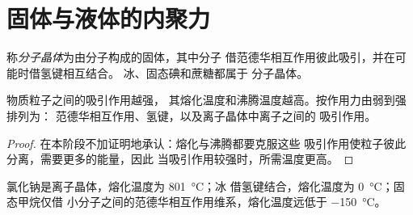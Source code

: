 \section{固体与液体的内聚力}

\begin{definition}[分子晶体]\label{def:g11:polarity-and-cohesion:molecular-solid}
称\emph{分子晶体}为由分子构成的固体，其中分子
借范德华相互作用彼此吸引，并在可能时借氢键相互结合。
冰、固态碘和蔗糖都属于
分子晶体。
\end{definition}

\begin{proposition}[内聚与相变]\label{prop:g11:polarity-and-cohesion:cohesion}
物质粒子之间的吸引作用越强，
其熔化温度和沸腾温度越高。按作用力由弱到强排列为：
范德华相互作用、氢键，以及离子晶体中离子之间的
吸引作用。
\end{proposition}

\begin{proof}
在本阶段不加证明地承认：熔化与沸腾都要克服这些
吸引作用使粒子彼此分离，需要更多的能量，因此
当吸引作用较强时，所需温度更高。
\end{proof}

\begin{example}[三种固体]\label{ex:g11:polarity-and-cohesion:three}
氯化钠是离子晶体，熔化温度为 \qty{801}{\celsius}；冰
借氢键结合，熔化温度为 \qty{0}{\celsius}；固态甲烷仅借
小分子之间的范德华相互作用维系，熔化温度远低于
\qty{-150}{\celsius}。
\end{example}


